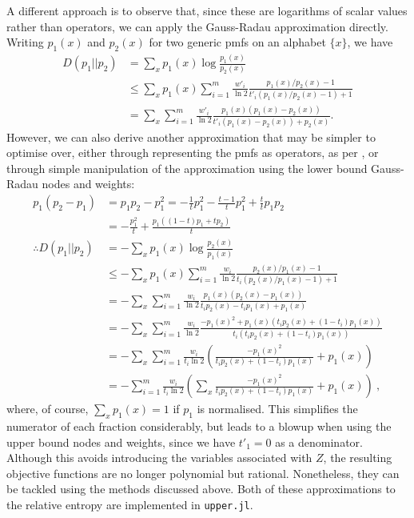 \documentclass[10pt, a4paper]{article}
\numberwithin{equation}{section} %
\theoremstyle{definition}
\theoremstyle{plain}
\newcommand{\?}{\mathrel{?}} %
\begin{document}
                        A different approach is to observe that, since these are logarithms of scalar values rather than operators, we can apply the Gauss-Radau approximation directly. Writing \(p_1(x)\) and \(p_2(x)\) for two generic pmfs on an alphabet \(\{x\}\), we have
                        \begin{align}
                          D(p_1||p_2) &= \sum_x p_1(x) \log \frac{p_1(x)}{p_2(x)} \\
                                      &\leq \sum_x p_1(x) \sum_{i=1}^m \frac{w'_i}{\ln 2} \frac{p_1(x)/p_2(x) - 1}{t'_i (p_1(x)/p_2(x)-1) + 1} \\
                                      &= \sum_x \sum_{i=1}^m \frac{w'_i}{\ln 2} \frac{p_1(x)(p_1(x) - p_2(x))}{t'_i (p_1(x)- p_2(x)) + p_2(x)}.
                        \end{align}
                        However, we can also derive another approximation that may be simpler to optimise over, either through representing the pmfs as operators, as per , or through simple manipulation of the approximation using the lower bound Gauss-Radau nodes and weights:
                        \begin{align}
                          p_1(p_2-p_1) &= p_1p_2 - p_1^2  = -\frac{1}{t} p_1^2 - \frac{t-1}{t} p_1^2 + \frac{t}{t} p_1p_2 \\
                                       &= -\frac{p_1^2}{t} + \frac{p_1((1-t)p_1+tp_2)}{t}  \\
                          \therefore D(p_1||p_2) &= -\sum_x p_1(x) \log \frac{p_2(x)}{p_1(x)} \\
                                                 &\leq -\sum_x p_1(x) \sum_{i=1}^m \frac{w_i}{\ln 2} \frac{p_2(x)/p_1(x) - 1}{t_i (p_2(x)/p_1(x)-1) + 1} \\
                                                 &= -\sum_x \sum_{i=1}^m \frac{w_i}{\ln 2} \frac{p_1(x) (p_2(x) - p_1(x))}{t_i p_2(x) - t_i p_1(x) + p_1(x)} \\
                                                 &= -\sum_x \sum_{i=1}^m \frac{w_i}{\ln 2} \frac{-{p_1(x)}^2 + p_1(x)(t_i p_2(x) + (1-t_i) p_1(x))}{t_i (t_i p_2(x) + (1-t_i) p_1(x)) } \\
                                                 &= -\sum_x \sum_{i=1}^m \frac{w_i}{t_i \ln 2}\left( \frac{-{p_1(x)}^2}{t_i p_2(x) + (1-t_i) p_1(x)} + p_1(x) \right)\\
                                                 &= -\sum_{i=1}^m \frac{w_i}{t_i \ln 2}\left( \sum_x \frac{-{p_1(x)}^2}{t_i p_2(x) + (1-t_i) p_1(x)} + p_1(x) \right)~\label{eqn:logratbound},
                        \end{align}
                        where, of course, \(\sum_x p_1(x) = 1\) if \(p_1\) is normalised. This simplifies the numerator of each fraction considerably, but leads to a blowup when using the upper bound nodes and weights, since we have \(t'_1 = 0\) as a denominator. Although this avoids introducing the variables associated with \(Z\), the resulting objective functions are no longer polynomial but rational. Nonetheless, they can be tackled using the methods discussed above. Both of these approximations to the relative entropy are implemented in \verb`upper.jl`.
\end{document}
